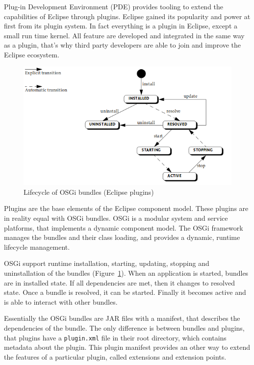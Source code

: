 Plug-in Development Environment (PDE) provides tooling to extend the capabilities of Eclipse through plugins. Eclipse gained its popularity and power at first from its plugin system. In fact everything is a plugin in Eclipse, except a small run time kernel. All feature are developed and integrated in the same way as a plugin, that's why third party developers are able to join and improve the Eclipse ecosystem.

\begin{figure}[htp]
\centering
\includegraphics[scale=0.5]{figures/design_osgi.png}
\caption{Lifecycle of OSGi bundles (Eclipse plugins)}
\label{fig:designosgi}
\end{figure}

Plugins are the base elements of the Eclipse component model. These plugins are in reality equal with OSGi bundles. OSGi is a modular system and service platforms, that implements a dynamic component model. The OSGi framework manages the bundles and their class loading, and provides a dynamic, runtime lifecycle management.

OSGi support runtime installation, starting, updating, stopping and uninstallation of the bundles (Figure~\ref{fig:designosgi}). When an application is started, bundles are in installed state. If all dependencies are met, then it changes to resolved state. Once a bundle is resolved, it can be started. Finally it becomes active and is able to interact with other bundles.

Essentially the OSGi bundles are JAR files with a manifest, that describes the dependencies of the bundle. The only difference is between bundles and plugins, that plugins have a \texttt{plugin.xml} file in their root directory, which contains metadata about the plugin. This plugin manifest provides an other way to extend the features of a particular plugin, called extensions and extension points.

